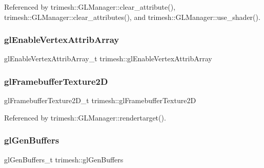 Referenced by trimesh\+::\+G\+L\+Manager\+::clear\+\_\+attribute(), trimesh\+::\+G\+L\+Manager\+::clear\+\_\+attributes(), and trimesh\+::\+G\+L\+Manager\+::use\+\_\+shader().

\mbox{\label{namespacetrimesh_ab9fe47b6aceb987ab51a7e7106e3fc3e}} 
\subsubsection{\texorpdfstring{gl\+Enable\+Vertex\+Attrib\+Array}{glEnableVertexAttribArray}}
{\footnotesize\ttfamily gl\+Enable\+Vertex\+Attrib\+Array\+\_\+t trimesh\+::gl\+Enable\+Vertex\+Attrib\+Array\hspace{0.3cm}{\ttfamily [static]}}

\mbox{\label{namespacetrimesh_a2907a7c51bbb468e5adcf661c996ec66}} 
\subsubsection{\texorpdfstring{gl\+Framebuffer\+Texture2D}{glFramebufferTexture2D}}
{\footnotesize\ttfamily gl\+Framebuffer\+Texture2\+D\+\_\+t trimesh\+::gl\+Framebuffer\+Texture2D\hspace{0.3cm}{\ttfamily [static]}}



Referenced by trimesh\+::\+G\+L\+Manager\+::rendertarget().

\mbox{\label{namespacetrimesh_ab1a53147bba32e80742ec1c91a6130f7}} 
\subsubsection{\texorpdfstring{gl\+Gen\+Buffers}{glGenBuffers}}
{\footnotesize\ttfamily gl\+Gen\+Buffers\+\_\+t trimesh\+::gl\+Gen\+Buffers\hspace{0.3cm}{\ttfamily [static]}}



